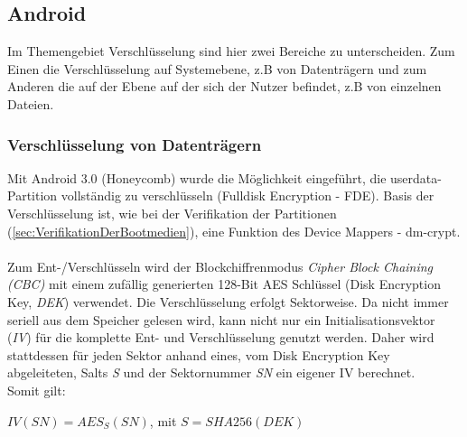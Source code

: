 \subsection{Android}
	Im Themengebiet Verschlüsselung sind hier zwei Bereiche zu unterscheiden. Zum Einen die Verschlüsselung auf Systemebene, z.B von Datenträgern und zum Anderen die auf der Ebene auf der sich der Nutzer befindet, z.B von einzelnen Dateien.

	\subsubsection{Verschlüsselung von Datenträgern}
	Mit Android 3.0 (Honeycomb) wurde die Möglichkeit eingeführt, die userdata-Partition vollständig zu verschlüsseln (Fulldisk Encryption - FDE). Basis der Verschlüsselung ist, wie bei der Verifikation der Partitionen (\ref{sec:VerifikationDerBootmedien}), eine Funktion des Device Mappers - dm-crypt.\\\\
	Zum Ent-/Verschlüsseln wird der Blockchiffrenmodus \textit{Cipher Block Chaining (CBC)} mit einem zufällig generierten 128-Bit AES Schlüssel (Disk Encryption Key, \textit{DEK}) verwendet. Die Verschlüsselung erfolgt Sektorweise. Da nicht immer seriell aus dem Speicher gelesen wird, kann nicht nur ein Initialisationsvektor (\textit{IV}) für die komplette Ent- und Verschlüsselung genutzt werden. Daher wird stattdessen für jeden Sektor anhand eines, vom Disk Encryption Key abgeleiteten, Salts \textit{S} und der Sektornummer \textit{SN} ein eigener IV berechnet.\\
	Somit gilt:
\begin{center}
	\begin{math}
	IV(SN) = AES_{S}(SN)\end{math}, mit \begin{math}S = SHA256(DEK)
	\end{math}
\end{center}
